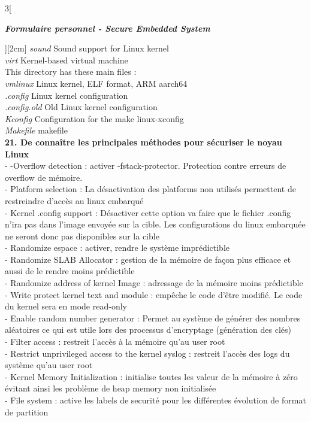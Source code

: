 \begin{multicols}{3}[\centerline{ \large\em \textbf{Formulaire personnel - Secure Embedded System}}][2cm]
\textit{sound} Sound support for Linux kernel\\
\textit{virt} Kernel-based virtual machine\\
This directory has these main files :\\
\textit{vmlinux} Linux kernel, ELF format, ARM aarch64\\
\textit{.config} Linux kernel configuration\\
\textit{.config.old} Old Linux kernel configuration\\
\textit{Kconfig} Configuration for the make linux-xconfig\\
\textit{Makefile} makefile
\\ \textbf{21. De connaître les principales méthodes pour sécuriser le noyau Linux\\}
- -Overflow detection : activer -fstack-protector. Protection contre erreurs de overflow de mémoire. \\
- Platform selection : La désactivation des platforms non utilisés permettent de restreindre d'accès au linux embarqué\\
- Kernel .config support : Désactiver cette option va faire que le fichier .config n'ira pas dans l'image envoyée sur la cible. Les configurations du linux embarquée ne seront donc pas disponibles sur la cible\\
- Randomize espace :  activer, rendre le système imprédictible\\
- Randomize SLAB Allocator : gestion de la mémoire de façon plus efficace et aussi de le rendre moins prédictible\\
- Randomize address of kernel Image : adressage de la mémoire moins prédictible\\
- Write protect kernel text and module : empêche le code d'être modifié. Le code du kernel sera en mode read-only\\
- Enable random number generator : Permet au système de générer des nombres aléatoires ce qui est utile lors des processus d'encryptage (génération des clés)\\
- Filter access : restreit l'accès à la mémoire qu'au user root\\
- Restrict unprivileged access to the kernel syslog : restreit l'accès des logs du système qu'au user root\\
- Kernel Memory Initialization : initialise toutes les valeur de la mémoire à zéro évitant ainsi les problème de heap memory non initialisée\\
- File system : active les labels de securité pour les différentes évolution de format de partition\\

\end{multicols}
